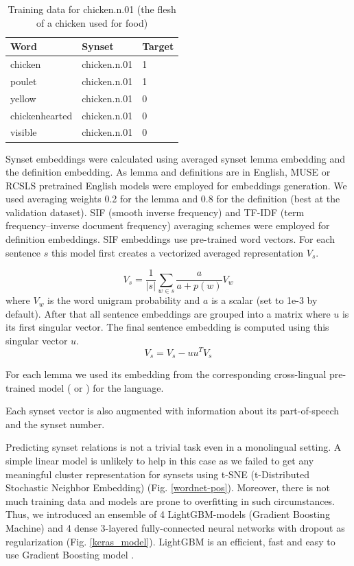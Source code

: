 \documentclass[11pt,a4paper]{article}
\begin{document}
	\begin{table}[!htbp]
	\small
	\caption{Training data for chicken.n.01 (the flesh of a chicken used for food)}
	\label{wordnet-training-data}		
	\centering
	\begin{tabular}{|l|l|l|}
		\hline
		Word & Synset & Target
		\\
		\hline
		chicken & chicken.n.01 & 1
		\\
		poulet & chicken.n.01 & 1
		\\
		yellow & chicken.n.01 & 0
		\\
		chickenhearted & chicken.n.01 & 0
		\\
		visible & chicken.n.01 & 0
		\\
		\hline
	\end{tabular}
	
\end{table}

Synset embeddings were calculated using averaged synset lemma embedding and the definition embedding. As lemma and definitions are in English, MUSE or RCSLS pretrained English models were employed for embeddings generation. We used averaging weights 0.2 for the lemma and 0.8 for the definition (best at the validation dataset). SIF (smooth inverse frequency) and TF-IDF (term frequency–inverse document frequency) averaging schemes were employed for definition embeddings. SIF \cite{Arora2017} embeddings use pre-trained word vectors. For each sentence $s$ this model first creates a vectorized averaged representation $V_s$.

$$V_s = \dfrac{1}{|s|}\sum_{w \in s} \frac{a}{a + p(w)}V_w$$
where $V_w$ is the word unigram probability and $a$ is a scalar (set to 1e-3 by default).
After that all sentence embeddings are grouped into a matrix where $u$ is its first singular vector. The final sentence embedding is computed using this singular vector $u$.
$$V_s = V_s - uu^TV_s$$


For each lemma we used its embedding from the corresponding cross-lingual pre-trained model (\cite{muse} or \cite{joulin2018loss}) for the language.

Each synset vector is also augmented with information about its part-of-speech and the synset number.

Predicting synset relations is not a trivial task even in a monolingual setting. A simple linear model is unlikely to help in this case as we failed to get any meaningful cluster representation for synsets using t-SNE (t-Distributed Stochastic Neighbor Embedding) \cite{tsne} (Fig. \ref{wordnet-pos}). Moreover, there is not much training data and models are prone to overfitting in such circumstances. Thus, we introduced an ensemble of 4 LightGBM-models (Gradient Boosting Machine) \cite{lgbm} and 4 dense 3-layered fully-connected neural networks with dropout as regularization \cite{dropout} (Fig. \ref{keras_model}). LightGBM is an efficient, fast and easy to use Gradient Boosting model \cite{natekin2013gradient}.
\end{document}
